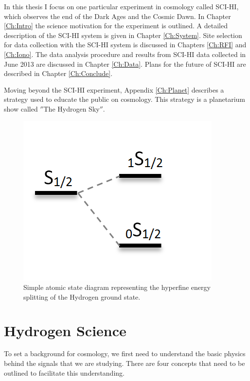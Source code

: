 In this thesis I focus on one particular experiment in \cm cosmology called SCI-HI, which observes the end of the Dark Ages and the Cosmic Dawn. In Chapter \ref{Ch:Intro} the science motivation for the experiment is outlined. A detailed description of the SCI-HI system is given in Chapter \ref{Ch:System}. Site selection for data collection with the SCI-HI system is discussed in Chapters \ref{Ch:RFI} and \ref{Ch:Iono}. The data analysis procedure and results from SCI-HI data collected in June 2013 are discussed in Chapter \ref{Ch:Data}. Plans for the future of SCI-HI are described in Chapter \ref{Ch:Conclude}. 

Moving beyond the SCI-HI experiment, Appendix \ref{Ch:Planet} describes a strategy used to educate the public on \cm cosmology. This strategy is a planetarium show called $''$The Hydrogen Sky$''$. 

\begin{figure}[hbt]
\begin{center}
\includegraphics[width=0.5\linewidth]{Introduction/figures/1s_spin_states.png}
\caption{Simple atomic state diagram representing the hyperfine energy splitting of the Hydrogen ground state. }
\label{Fig:spin_states}
\end{center}
\end{figure}

\section{Hydrogen \cm Science}

To set a background for \cm cosmology, we first need to understand the basic physics behind the signals that we are studying. There are four concepts that need to be outlined to facilitate this understanding. 

